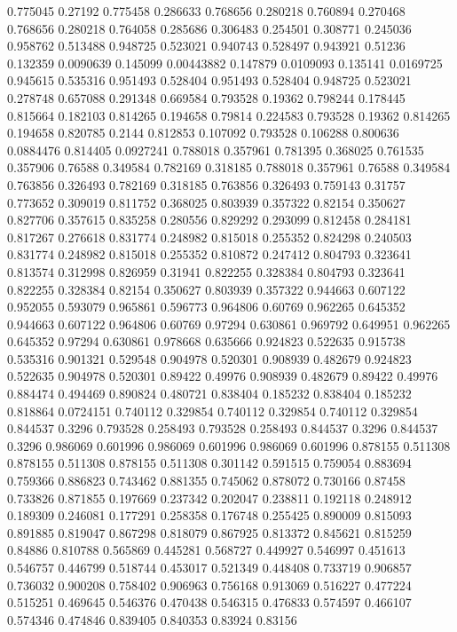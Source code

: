 0.775045 0.27192
0.775458 0.286633
0.768656 0.280218
0.760894 0.270468
0.768656 0.280218
0.764058 0.285686
0.306483 0.254501
0.308771 0.245036
0.958762 0.513488
0.948725 0.523021
0.940743 0.528497
0.943921 0.51236
0.132359 0.0090639
0.145099 0.00443882
0.147879 0.0109093
0.135141 0.0169725
0.945615 0.535316
0.951493 0.528404
0.951493 0.528404
0.948725 0.523021
0.278748 0.657088
0.291348 0.669584
0.793528 0.19362
0.798244 0.178445
0.815664 0.182103
0.814265 0.194658
0.79814 0.224583
0.793528 0.19362
0.814265 0.194658
0.820785 0.2144
0.812853 0.107092
0.793528 0.106288
0.800636 0.0884476
0.814405 0.0927241
0.788018 0.357961
0.781395 0.368025
0.761535 0.357906
0.76588 0.349584
0.782169 0.318185
0.788018 0.357961
0.76588 0.349584
0.763856 0.326493
0.782169 0.318185
0.763856 0.326493
0.759143 0.31757
0.773652 0.309019
0.811752 0.368025
0.803939 0.357322
0.82154 0.350627
0.827706 0.357615
0.835258 0.280556
0.829292 0.293099
0.812458 0.284181
0.817267 0.276618
0.831774 0.248982
0.815018 0.255352
0.824298 0.240503
0.831774 0.248982
0.815018 0.255352
0.810872 0.247412
0.804793 0.323641
0.813574 0.312998
0.826959 0.31941
0.822255 0.328384
0.804793 0.323641
0.822255 0.328384
0.82154 0.350627
0.803939 0.357322
0.944663 0.607122
0.952055 0.593079
0.965861 0.596773
0.964806 0.60769
0.962265 0.645352
0.944663 0.607122
0.964806 0.60769
0.97294 0.630861
0.969792 0.649951
0.962265 0.645352
0.97294 0.630861
0.978668 0.635666
0.924823 0.522635
0.915738 0.535316
0.901321 0.529548
0.904978 0.520301
0.908939 0.482679
0.924823 0.522635
0.904978 0.520301
0.89422 0.49976
0.908939 0.482679
0.89422 0.49976
0.884474 0.494469
0.890824 0.480721
0.838404 0.185232
0.838404 0.185232
0.818864 0.0724151
0.740112 0.329854
0.740112 0.329854
0.740112 0.329854
0.844537 0.3296
0.793528 0.258493
0.793528 0.258493
0.844537 0.3296
0.844537 0.3296
0.986069 0.601996
0.986069 0.601996
0.986069 0.601996
0.878155 0.511308
0.878155 0.511308
0.878155 0.511308
0.301142 0.591515
0.759054 0.883694
0.759366 0.886823
0.743462 0.881355
0.745062 0.878072
0.730166 0.87458
0.733826 0.871855
0.197669 0.237342
0.202047 0.238811
0.192118 0.248912
0.189309 0.246081
0.177291 0.258358
0.176748 0.255425
0.890009 0.815093
0.891885 0.819047
0.867298 0.818079
0.867925 0.813372
0.845621 0.815259
0.84886 0.810788
0.565869 0.445281
0.568727 0.449927
0.546997 0.451613
0.546757 0.446799
0.518744 0.453017
0.521349 0.448408
0.733719 0.906857
0.736032 0.900208
0.758402 0.906963
0.756168 0.913069
0.516227 0.477224
0.515251 0.469645
0.546376 0.470438
0.546315 0.476833
0.574597 0.466107
0.574346 0.474846
0.839405 0.840353
0.83924 0.83156
